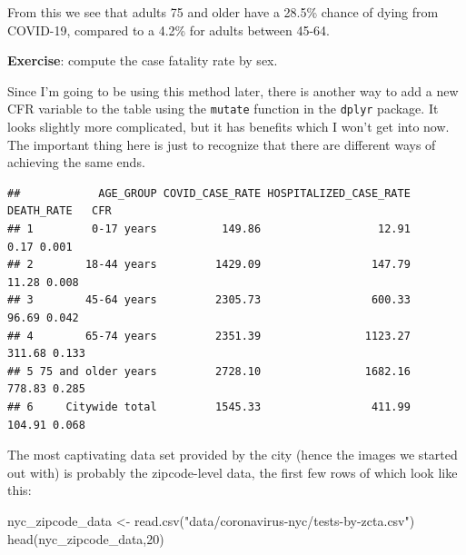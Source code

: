 \documentclass[
  openany]{book}
\newenvironment{Shaded}{\begin{snugshade}}{\end{snugshade}}
\newcommand{\AttributeTok}[1]{\textcolor[rgb]{0.77,0.63,0.00}{#1}}
\newcommand{\CommentTok}[1]{\textcolor[rgb]{0.56,0.35,0.01}{\textit{#1}}}
\newcommand{\DecValTok}[1]{\textcolor[rgb]{0.00,0.00,0.81}{#1}}
\newcommand{\FunctionTok}[1]{\textcolor[rgb]{0.00,0.00,0.00}{#1}}
\newcommand{\NormalTok}[1]{#1}
\newcommand{\OtherTok}[1]{\textcolor[rgb]{0.56,0.35,0.01}{#1}}
\newcommand{\SpecialCharTok}[1]{\textcolor[rgb]{0.00,0.00,0.00}{#1}}
\newcommand{\StringTok}[1]{\textcolor[rgb]{0.31,0.60,0.02}{#1}}
\begin{document}
From this we see that adults 75 and older have a 28.5\% chance of dying from COVID-19, compared to a 4.2\% for adults between 45-64.

\textbf{Exercise}: compute the case fatality rate by sex.

Since I'm going to be using this method later, there is another way to add a new CFR variable to the table using the \texttt{mutate} function in the \texttt{dplyr} package. It looks slightly more complicated, but it has benefits which I won't get into now. The important thing here is just to recognize that there are different ways of achieving the same ends.

\begin{Shaded}
\end{Shaded}

\begin{verbatim}
##            AGE_GROUP COVID_CASE_RATE HOSPITALIZED_CASE_RATE DEATH_RATE   CFR
## 1         0-17 years          149.86                  12.91       0.17 0.001
## 2        18-44 years         1429.09                 147.79      11.28 0.008
## 3        45-64 years         2305.73                 600.33      96.69 0.042
## 4        65-74 years         2351.39                1123.27     311.68 0.133
## 5 75 and older years         2728.10                1682.16     778.83 0.285
## 6     Citywide total         1545.33                 411.99     104.91 0.068
\end{verbatim}

The most captivating data set provided by the city (hence the images we started out with) is probably the zipcode-level data, the first few rows of which look like this:

\begin{Shaded}
\begin{Highlighting}[]
\NormalTok{nyc\_zipcode\_data }\OtherTok{\textless{}{-}} \FunctionTok{read.csv}\NormalTok{(}\StringTok{"data/coronavirus{-}nyc/tests{-}by{-}zcta.csv"}\NormalTok{)}
\FunctionTok{head}\NormalTok{(nyc\_zipcode\_data,}\DecValTok{20}\NormalTok{)}
\end{Highlighting}
\end{Shaded}
\end{document}
